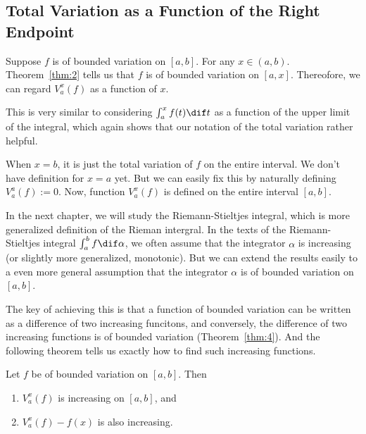 \documentclass[thmcnt=section, color=blue, 12pt]{my-elegantbook}
\begin{document}
\subsection{Total Variation as a Function of the Right Endpoint}

Suppose $f$ is of bounded variation on $[a, b]$.
For any $x \in (a, b)$.
Theorem~\ref{thm:2} tells us that $f$ is of bounded variation on $[a, x]$.
Thereofore, we can regard $V_a^x (f)$ as a function of $x$.

\begin{note}
	This is very similar to considering $\int_a^x f(t) \dif t$ as a function
	of the upper limit of the integral, which
	again shows that our notation of the total variation rather helpful.
\end{note}

When $x = b$, it is just the total variation of $f$ on the entire interval.
We don't have definition for $x = a$ yet.
But we can easily fix this by naturally defining $V_a^a (f) := 0$.
Now, function $V_a^x(f)$ is defined on the entire interval $[a, b]$.

In the next chapter, we will study the Riemann-Stieltjes integral, which
is more generalized definition of the Rieman intergral.
In the texts of the Riemann-Stieltjes integral $\int_a^b f \dif \alpha$,
we often assume that the integrator $\alpha$ is increasing
(or slightly more generalized, monotonic)\cite{rudinPrinciplesMathematicalAnalysis1976}.
But we can extend the results easily to a even more
general assumption that the integrator $\alpha$
is of bounded variation on $[a, b]$.

The key of achieving this is that a function of bounded variation
can be written as a difference of two increasing funcitons,
and conversely, the difference of two increasing functions
is of bounded variation
(Theorem~\ref{thm:4}).
And the following theorem tells us exactly how to
find such increasing
functions.

\begin{theorem} \label{thm:3}
	Let $f$ be of bounded variation on $[a, b]$.
	Then
	\begin{enumerate}
		\item $V_a^x(f)$ is increasing on $[a, b]$, and
		\item $V_a^x(f) - f(x)$ is also increasing.
	\end{enumerate}
\end{theorem}
\end{document}
